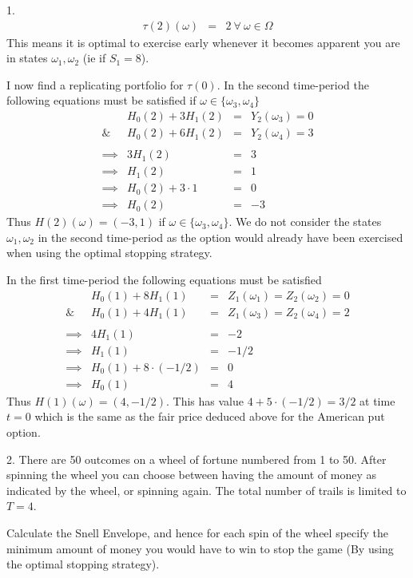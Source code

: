 \documentclass[11pt,a4paper]{article}
\begin{document}
\begin{answer}{1.}
\[\begin{array}{rcl}
    \tau(2)(\omega)&=&2\ \forall\ \omega\in\Omega
  \end{array}\]
  This means it is optimal to exercise early whenever it becomes apparent you are in states $\omega_1,\omega_2$ (ie if $S_1=8$).
  \par I now find a replicating portfolio for $\tau(0)$. In the second time-period the following equations must be satisfied if $\omega\in\{\omega_3,\omega_4\}$
  \[\begin{array}{rrcl}
    &H_0(2)+3H_1(2)&=&Y_2(\omega_3)=0\\
    \&&H_0(2)+6H_1(2)&=&Y_2(\omega_4)=3\\
    \\
    \implies&3H_1(2)&=&3\\
    \implies&H_1(2)&=&1\\
    \implies&H_0(2)+3\cdot1&=&0\\
    \implies&H_0(2)&=&-3
  \end{array}\]
  Thus $H(2)(\omega)=(-3,1)$ if $\omega\in\{\omega_3,\omega_4\}$. We do not consider the states $\omega_1,\omega_2$ in the second time-period as the option would already have been exercised when using the optimal stopping strategy.
  \par In the first time-period the following equations must be satisfied
  \[\begin{array}{rrcl}
    &H_0(1)+8H_1(1)&=&Z_1(\omega_1)=Z_2(\omega_2)=0\\
    \&&H_0(1)+4H_1(1)&=&Z_1(\omega_3)=Z_2(\omega_4)=2\\
    \\
    \implies&4H_1(1)&=&-2\\
    \implies&H_1(1)&=&-1/2\\
    \implies&H_0(1)+8\cdot(-1/2)&=&0\\
    \implies&H_0(1)&=&4
  \end{array}\]
  Thus $H(1)(\omega)=(4,-1/2)$. This has value $4+5\cdot(-1/2)=3/2$ at time $t=0$ which is the same as the fair price deduced above for the American put option.
\end{answer}

\begin{question}{2.}
  There are 50 outcomes on a wheel of fortune numbered from 1 to 50. After spinning the wheel you can choose between having the amount of money as indicated by the wheel, or spinning again. The total number of trails is limited to $T=4$.
  \par Calculate the Snell Envelope, and hence for each spin of the wheel specify the minimum amount of money you would have to win to stop the game (By using the optimal stopping strategy).
\end{question}
\end{document}

